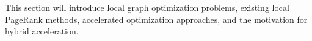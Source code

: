 This section will introduce local graph optimization problems, existing local PageRank methods, accelerated optimization approaches, and the motivation for hybrid acceleration.

